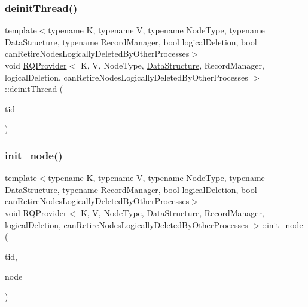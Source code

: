 \mbox{\label{classRQProvider_a3f20b96dfa5a47d9f59ada98e3322695}} 
\subsubsection{\texorpdfstring{deinit\+Thread()}{deinitThread()}\hspace{0.1cm}{\footnotesize\ttfamily [5/5]}}
{\footnotesize\ttfamily template$<$typename K, typename V, typename Node\+Type, typename Data\+Structure, typename Record\+Manager, bool logical\+Deletion, bool can\+Retire\+Nodes\+Logically\+Deleted\+By\+Other\+Processes$>$ \\
void \hyperlink{classRQProvider}{R\+Q\+Provider}$<$ K, V, Node\+Type, \hyperlink{classDataStructure}{Data\+Structure}, Record\+Manager, logical\+Deletion, can\+Retire\+Nodes\+Logically\+Deleted\+By\+Other\+Processes $>$\+::deinit\+Thread (\begin{DoxyParamCaption}\item[{const int}]{tid }\end{DoxyParamCaption})\hspace{0.3cm}{\ttfamily [inline]}}

\mbox{\label{classRQProvider_a2cd517d996a170c029435b638c9cf219}} 
\subsubsection{\texorpdfstring{init\+\_\+node()}{init\_node()}\hspace{0.1cm}{\footnotesize\ttfamily [1/5]}}
{\footnotesize\ttfamily template$<$typename K, typename V, typename Node\+Type, typename Data\+Structure, typename Record\+Manager, bool logical\+Deletion, bool can\+Retire\+Nodes\+Logically\+Deleted\+By\+Other\+Processes$>$ \\
void \hyperlink{classRQProvider}{R\+Q\+Provider}$<$ K, V, Node\+Type, \hyperlink{classDataStructure}{Data\+Structure}, Record\+Manager, logical\+Deletion, can\+Retire\+Nodes\+Logically\+Deleted\+By\+Other\+Processes $>$\+::init\+\_\+node (\begin{DoxyParamCaption}\item[{const int}]{tid,  }\item[{Node\+Type $\ast$const}]{node }\end{DoxyParamCaption})\hspace{0.3cm}{\ttfamily [inline]}}

